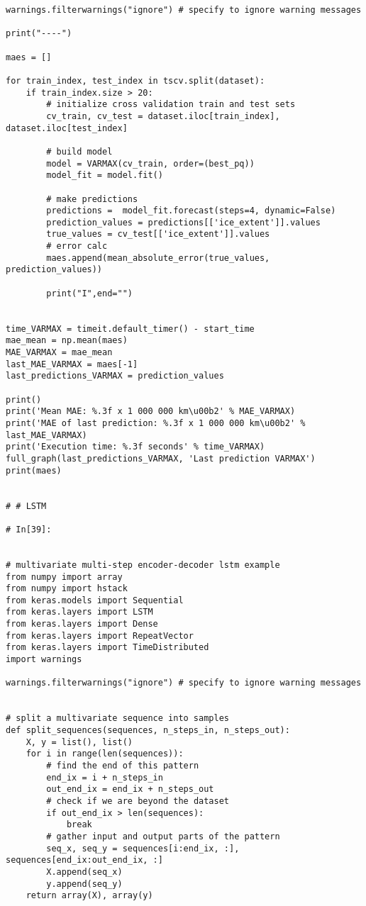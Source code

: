 \begin{verbatim}
warnings.filterwarnings("ignore") # specify to ignore warning messages

print("----")

maes = []

for train_index, test_index in tscv.split(dataset):
    if train_index.size > 20:
        # initialize cross validation train and test sets
        cv_train, cv_test = dataset.iloc[train_index], dataset.iloc[test_index]

        # build model
        model = VARMAX(cv_train, order=(best_pq))
        model_fit = model.fit()

        # make predictions
        predictions =  model_fit.forecast(steps=4, dynamic=False)
        prediction_values = predictions[['ice_extent']].values
        true_values = cv_test[['ice_extent']].values
        # error calc
        maes.append(mean_absolute_error(true_values, prediction_values))

        print("I",end="")
    

time_VARMAX = timeit.default_timer() - start_time
mae_mean = np.mean(maes)
MAE_VARMAX = mae_mean
last_MAE_VARMAX = maes[-1]
last_predictions_VARMAX = prediction_values

print()
print('Mean MAE: %.3f x 1 000 000 km\u00b2' % MAE_VARMAX)
print('MAE of last prediction: %.3f x 1 000 000 km\u00b2' % last_MAE_VARMAX)
print('Execution time: %.3f seconds' % time_VARMAX)
full_graph(last_predictions_VARMAX, 'Last prediction VARMAX')
print(maes)


# # LSTM

# In[39]:


# multivariate multi-step encoder-decoder lstm example
from numpy import array
from numpy import hstack
from keras.models import Sequential
from keras.layers import LSTM
from keras.layers import Dense
from keras.layers import RepeatVector
from keras.layers import TimeDistributed
import warnings

warnings.filterwarnings("ignore") # specify to ignore warning messages


# split a multivariate sequence into samples
def split_sequences(sequences, n_steps_in, n_steps_out):
	X, y = list(), list()
	for i in range(len(sequences)):
		# find the end of this pattern
		end_ix = i + n_steps_in
		out_end_ix = end_ix + n_steps_out
		# check if we are beyond the dataset
		if out_end_ix > len(sequences):
			break
		# gather input and output parts of the pattern
		seq_x, seq_y = sequences[i:end_ix, :], sequences[end_ix:out_end_ix, :]
		X.append(seq_x)
		y.append(seq_y)
	return array(X), array(y)


\end{verbatim}
